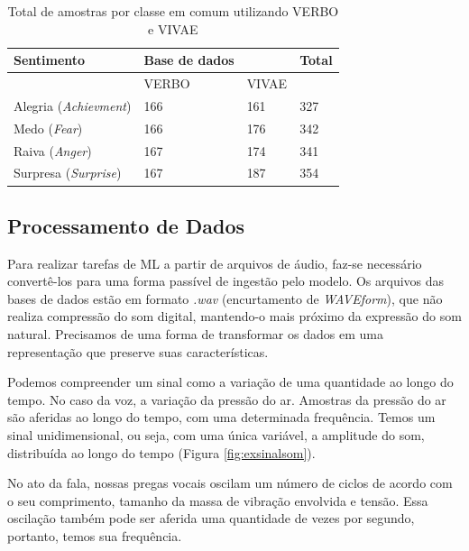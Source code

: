 \begin{table}[]
    \centering
    \caption{Total de amostras por classe em comum utilizando \acrshort{VERBO} e \acrshort{VIVAE}}
    \begin{tabular}{|l|l|l|l|}
    \hline
        Sentimento & Base de dados & ~ & Total \\ \hline
        ~ & VERBO & VIVAE & ~ \\ \hline
        Alegria (\textit{Achievment}) & 166 & 161 & 327 \\ \hline
        Medo (\textit{Fear}) & 166 & 176 & 342 \\ \hline
        Raiva (\textit{Anger}) & 167 & 174 & 341 \\ \hline
        Surpresa (\textit{Surprise}) & 167 & 187 & 354 \\ \hline
    \end{tabular}\label{table:totalporclasse}
\end{table}

\subsection{Processamento de Dados}\label{sec:procdados}

Para realizar tarefas de \acrshort{ML} a partir de arquivos de áudio, faz-se necessário convertê-los para uma forma passível de ingestão pelo modelo. Os arquivos das bases de dados estão em formato \textit{.wav} (encurtamento de \textit{WAVEform}), que não realiza compressão do som digital, mantendo-o mais próximo da expressão do som natural. Precisamos de uma forma de transformar os dados em uma representação que preserve suas características.

Podemos compreender um sinal como a variação de uma quantidade ao longo do tempo. No caso da voz, a variação da pressão do ar. Amostras da pressão do ar são aferidas ao longo do tempo, com uma determinada frequência. Temos um sinal unidimensional, ou seja, com uma única variável, a amplitude do som, distribuída ao longo do tempo (Figura \ref{fig:exsinalsom}).

No ato da fala, nossas pregas vocais oscilam um número de ciclos de acordo com o  seu comprimento, tamanho da massa de vibração envolvida e tensão. Essa oscilação também pode ser aferida uma quantidade de vezes por segundo, portanto, temos sua frequência.


